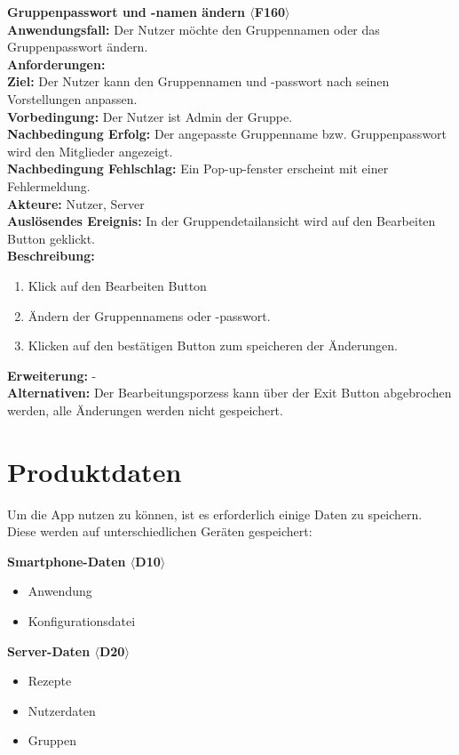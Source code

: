 \documentclass[parskip=full]{scrartcl}
\begin{document}
\textbf{Gruppenpasswort und -namen ändern $\langle$F160$\rangle$}\\
\textbf{Anwendungsfall:} Der Nutzer möchte den Gruppennamen oder das Gruppenpasswort ändern.\\
\textbf{Anforderungen:} \\
\textbf{Ziel:} Der Nutzer kann den Gruppennamen und -passwort nach seinen Vorstellungen anpassen.\\
\textbf{Vorbedingung:} Der Nutzer ist Admin der Gruppe.\\
\textbf{Nachbedingung Erfolg:} Der angepasste Gruppenname bzw. Gruppenpasswort wird den Mitglieder angezeigt.\\
\textbf{Nachbedingung Fehlschlag:} Ein Pop-up-fenster erscheint mit einer Fehlermeldung.\\
\textbf{Akteure:} Nutzer, Server \\
\textbf{Auslösendes Ereignis:} In der Gruppendetailansicht wird auf den Bearbeiten Button geklickt.\\
\textbf{Beschreibung:}
\begin{enumerate}
    \item Klick auf den Bearbeiten Button
    \item Ändern der Gruppennamens oder -passwort.
    \item Klicken auf den bestätigen Button zum speicheren der Änderungen.
\end{enumerate}
\textbf{Erweiterung:} -\\
\textbf{Alternativen:} Der Bearbeitungsporzess kann über der Exit Button abgebrochen werden, alle Änderungen werden nicht gespeichert.\\
\newpage


\section{Produktdaten}
Um die App nutzen zu können, ist es erforderlich einige Daten zu speichern. Diese werden auf unterschiedlichen Geräten gespeichert:

\textbf{Smartphone-Daten $\langle$D10$\rangle$}
\begin{itemize}
    \item Anwendung
    \item Konfigurationsdatei
\end{itemize}

\textbf{Server-Daten $\langle$D20$\rangle$}
\begin{itemize}
    \item Rezepte
    \item Nutzerdaten
    \item Gruppen
\end{itemize}
\end{document}
